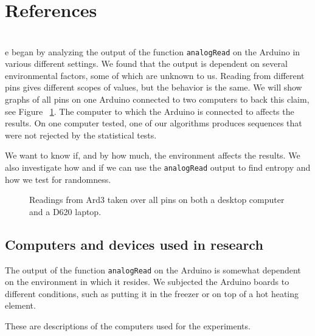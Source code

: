 \documentclass[a4paper]{article}           %
\newcommand{\tmpsection}[1]{}
\let\tmpsection=\section
\renewcommand{\section}[2]{

    \ifthenelse{
      \equal{#2}{*} %
    }
    {
      \tmpsection{References}
      \tmpsection{\sc{#2} }
    }
    {\tmpsection{\sc{#1} } }
      

}
\begin{document}
\section{Experimental Results}

We began by analyzing the output of the function \texttt{analogRead} on the Arduino in various different settings. We found that the output is dependent on several environmental factors, some of which are unknown to us. Reading from different pins gives different scopes of values, but the behavior is the same. We will show graphs of all pins on one Arduino connected to two computers to back this claim, see Figure ~\ref{fig:allpins}. The computer to which the Arduino is connected to affects the results. On one computer tested, one of our algorithms produces sequences that were not rejected by the statistical tests. 

We want to know if, and by how much, the environment affects the results. We also investigate how and if we can use the \texttt{analogRead} output to find entropy and how we test for randomness. 

  \begin{figure}[h!]
    \centering  

    \caption{Readings from Ard3 taken over all pins on both a desktop computer and a D620 laptop.}
    \label{fig:allpins}
        
  \end{figure}


\subsection{Computers and devices used in research}

The output of the function \texttt{analogRead} on the Arduino is somewhat dependent on the environment in which it resides. We subjected the Arduino boards to different conditions, such as putting it in the freezer or on top of a hot heating element. 

These are descriptions of the computers used for the experiments. 

\end{document}
